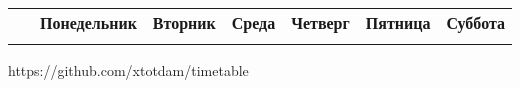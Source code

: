 \documentclass[12pt,landscape]{report}
\begin{document}
\centering


\begin{tabular}{@{}|c!{\vrule width 1.25pt}c|c|c|c|c|c|@{}}
\hline
~ &
\textbf{Понедельник} &
\textbf{Вторник} &
\textbf{Среда} &
\textbf{Четверг} &
\textbf{Пятница} &
\textbf{Суббота}
\\ 



\\ \hline

\end{tabular}

\vfill\hfill{\color{gray!50}\scriptsize https://github.com/xtotdam/timetable}
\end{document}
